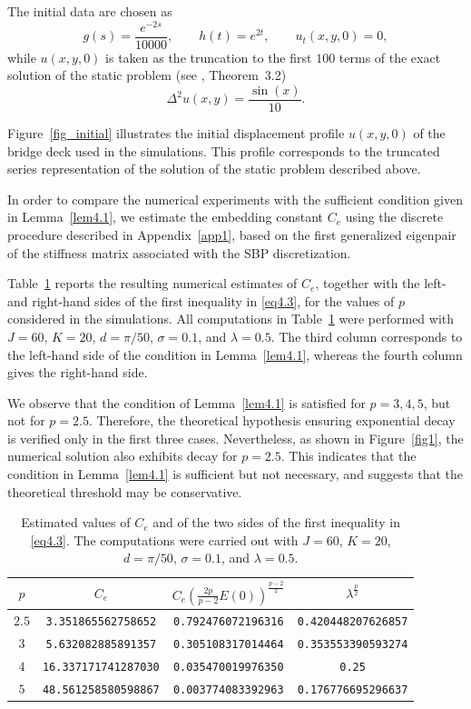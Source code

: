 \documentclass[12pt]{article}
\numberwithin{equation}{section}
\begin{document}
The initial data are chosen as
\[
g(s)=\frac{e^{-2s}}{10000},\qquad h(t)=e^{2t},\qquad u_t(x,y,0)=0,
\]
while $u(x,y,0)$ is taken as the truncation to the first $100$ terms of the
exact solution of the static problem (see \cite{Ferr1}, Theorem~3.2)
\[
\Delta^2u(x,y)=\frac{\sin(x)}{10}.
\]

Figure~\ref{fig_initial} illustrates the initial displacement profile
$u(x,y,0)$ of the bridge deck used in the simulations. This profile
corresponds to the truncated series representation of the solution of
the static problem described above.

In order to compare the numerical experiments with the sufficient condition
given in Lemma~\ref{lem4.1}, we estimate the embedding constant $C_e$
using the discrete procedure described in Appendix~\ref{app1}, based on
the first generalized eigenpair of the stiffness matrix associated with
the SBP discretization.

Table~\ref{table1} reports the resulting numerical estimates of $C_e$,
together with the left- and right-hand sides of the first inequality
in \eqref{eq4.3}, for the values of $p$ considered in the simulations.
All computations in Table~\ref{table1} were performed with
$J=60$, $K=20$, $d=\pi/50$, $\sigma=0.1$, and $\lambda=0.5$.
The third column corresponds to the left-hand side of the condition in
Lemma~\ref{lem4.1}, whereas the fourth column gives the right-hand side.

We observe that the condition of Lemma~\ref{lem4.1} is satisfied for
$p=3,4,5$, but not for $p=2.5$. Therefore, the theoretical hypothesis
ensuring exponential decay is verified only in the first three cases.
Nevertheless, as shown in Figure~\ref{fig1}, the numerical solution also
exhibits decay for $p=2.5$. This indicates that the condition in
Lemma~\ref{lem4.1} is sufficient but not necessary, and suggests that the
theoretical threshold may be conservative.

\begin{table}[hbt]
    \centering
    \begin{tabular}{c|c|c|c}
         $p$ & $C_e$& $C_{e}\left(\frac{2 p}{p-2} E(0)\right)^{\frac{p-2}{2}}$ & $\lambda^{\frac{p}{2}}$  \\ \hline
         $2.5$ & {\tt 3.351865562758652}& {\tt 0.792476072196316} & {\tt 0.420448207626857}   \\ \hline
         $3$ & {\tt 5.632082885891357} & {\tt 0.305108317014464} & {\tt 0.353553390593274}  \\ \hline
         $4$ & {\tt 16.337171741287030} & {\tt 0.035470019976350} & {\tt 0.25} \\ \hline
         $5$ & {\tt 48.561258580598867} & {\tt 0.003774083392963} & {\tt 0.176776695296637} \\
    \end{tabular}
    \caption{Estimated values of $C_e$ and of the two sides of the first inequality in \eqref{eq4.3}. The computations were carried out with $J=60$, $K=20$, $d=\pi/50$, $\sigma=0.1$, and $\lambda=0.5$.}
    \label{table1}
\end{table}
\end{document}
